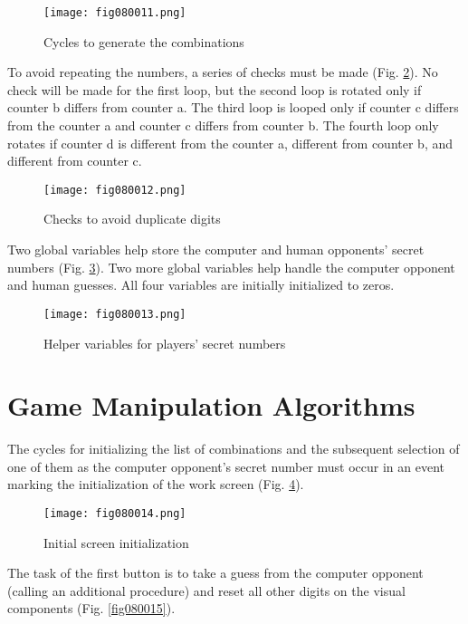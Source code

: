 \begin{figure}[H]
   \centering
   \texttt{[image: fig080011.png]}
   \caption{Cycles to generate the combinations}
\label{fig080011}
\end{figure}

To avoid repeating the numbers, a series of checks must be made (Fig. \ref{fig080012}). No check will be made for the first loop, but the second loop is rotated only if counter b differs from counter a. The third loop is looped only if counter c differs from the counter a and counter c differs from counter b. The fourth loop only rotates if counter d is different from the counter a, different from counter b, and different from counter c.

\begin{figure}[H]
   \centering
   \texttt{[image: fig080012.png]}
   \caption{Checks to avoid duplicate digits}
\label{fig080012}
\end{figure}

Two global variables help store the computer and human opponents' secret numbers (Fig. \ref{fig080013}). Two more global variables help handle the computer opponent and human guesses. All four variables are initially initialized to zeros.

\begin{figure}[H]
   \centering
   \texttt{[image: fig080013.png]}
   \caption{Helper variables for players' secret numbers}
\label{fig080013}
\end{figure}

\section{Game Manipulation Algorithms}

The cycles for initializing the list of combinations and the subsequent selection of one of them as the computer opponent's secret number must occur in an event marking the initialization of the work screen (Fig. \ref{fig080014}).

\begin{figure}[H]
   \centering
   \texttt{[image: fig080014.png]}
   \caption{Initial screen initialization}
\label{fig080014}
\end{figure}

The task of the first button is to take a guess from the computer opponent (calling an additional procedure) and reset all other digits on the visual components (Fig. \ref{fig080015}).

